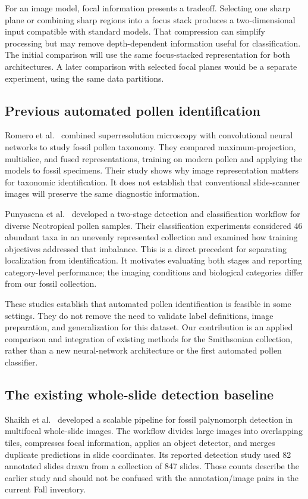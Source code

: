 \documentclass[11pt,letterpaper]{article}
\begin{document}
For an image model, focal information presents a tradeoff. Selecting one sharp plane or combining sharp regions into a focus stack produces a two-dimensional input compatible with standard models. That compression can simplify processing but may remove depth-dependent information useful for classification. The initial comparison will use the same focus-stacked representation for both architectures. A later comparison with selected focal planes would be a separate experiment, using the same data partitions.

\subsection{Previous automated pollen identification}
Romero et al.\ \citep{romero2020} combined superresolution microscopy with convolutional neural networks to study fossil pollen taxonomy. They compared maximum-projection, multislice, and fused representations, training on modern pollen and applying the models to fossil specimens. Their study shows why image representation matters for taxonomic identification. It does not establish that conventional slide-scanner images will preserve the same diagnostic information.

Punyasena et al.\ \citep{punyasena2022} developed a two-stage detection and classification workflow for diverse Neotropical pollen samples. Their classification experiments considered 46 abundant taxa in an unevenly represented collection and examined how training objectives addressed that imbalance. This is a direct precedent for separating localization from identification. It motivates evaluating both stages and reporting category-level performance; the imaging conditions and biological categories differ from our fossil collection.

These studies establish that automated pollen identification is feasible in some settings. They do not remove the need to validate label definitions, image preparation, and generalization for this dataset. Our contribution is an applied comparison and integration of existing methods for the Smithsonian collection, rather than a new neural-network architecture or the first automated pollen classifier.

\subsection{The existing whole-slide detection baseline}
Shaikh et al.\ \citep{shaikh2026} developed a scalable pipeline for fossil palynomorph detection in multifocal whole-slide images. The workflow divides large images into overlapping tiles, compresses focal information, applies an object detector, and merges duplicate predictions in slide coordinates. Its reported detection study used 82 annotated slides drawn from a collection of 847 slides. Those counts describe the earlier study and should not be confused with the \SlideCount{} annotation/image pairs in the current Fall inventory.
\end{document}
